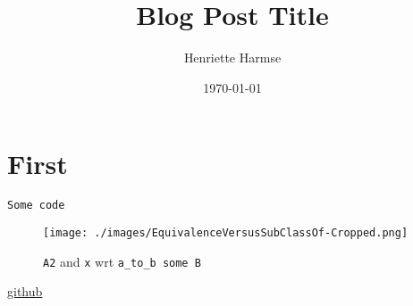 \documentclass{amsart}
\title{Blog Post Title}
\author{Henriette Harmse}
\date{\today}
\begin{document}
  \maketitle
  \section{First}
  \cite{Aameri2015}

\begin{small}
\begin{verbatim} 
Some code
\end{verbatim}
\end{small}

\begin{figure}
	\centering \texttt{[image: ./images/EquivalenceVersusSubClassOf-Cropped.png]}
	\caption{\texttt{A2} and \texttt{x} wrt \texttt{a\_to\_b some B}}
\end{figure}

\href{http://}{github}
  
  
  
 
\end{document}
